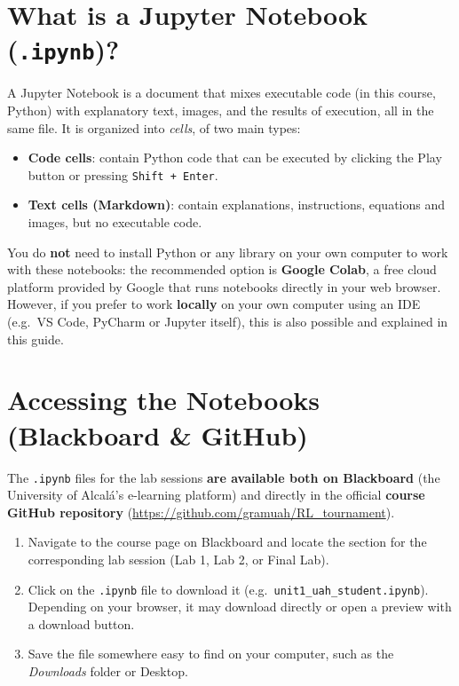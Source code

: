 \documentclass[11pt,a4paper]{article}
\begin{document}
\section{What is a Jupyter Notebook (\texttt{.ipynb})?}

A Jupyter Notebook is a document that mixes executable code (in this course, Python) with explanatory text, images, and the results of execution, all in the same file. It is organized into \textit{cells}, of two main types:

\begin{itemize}
    \item \textbf{Code cells}: contain Python code that can be executed by clicking the Play button or pressing \texttt{Shift + Enter}.
    \item \textbf{Text cells (Markdown)}: contain explanations, instructions, equations and images, but no executable code.
\end{itemize}

You do \textbf{not} need to install Python or any library on your own computer to work with these notebooks: the recommended option is \textbf{Google Colab}, a free cloud platform provided by Google that runs notebooks directly in your web browser. However, if you prefer to work \textbf{locally} on your own computer using an IDE (e.g.\ VS Code, PyCharm or Jupyter itself), this is also possible and explained in this guide.

\section{Accessing the Notebooks (Blackboard \& GitHub)}

The \texttt{.ipynb} files for the lab sessions \textbf{are available both on Blackboard} (the University of Alcal\'a's e-learning platform) and directly in the official \textbf{course GitHub repository} (\url{https://github.com/gramuah/RL_tournament}).

\begin{infobox}
\begin{enumerate}
    \item Navigate to the course page on Blackboard and locate the section for the corresponding lab session (Lab 1, Lab 2, or Final Lab).
    \item Click on the \texttt{.ipynb} file to download it (e.g.\ \texttt{unit1\_uah\_student.ipynb}). Depending on your browser, it may download directly or open a preview with a download button.
    \item Save the file somewhere easy to find on your computer, such as the \textit{Downloads} folder or Desktop.
\end{enumerate}
\end{infobox}
\end{document}

